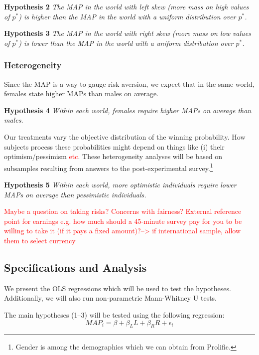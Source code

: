 \noindent \textbf{Hypothesis 2} \quad \textit{The MAP in the world with left skew (more mass on high values of $p^*$) is higher than the MAP in the world with a uniform distribution over $p^*$.}

\noindent \textbf{Hypothesis 3} \quad \textit{The MAP in the world with right skew (more mass on low values of $p^*$) is lower than the MAP in the world with a uniform distribution over $p^*$.}

\subsubsection{Heterogeneity}
Since the MAP is a way to gauge risk aversion, we expect that in the same world, females state higher MAPs than males on average.

\noindent \textbf{Hypothesis 4} \quad \textit{Within each world, females require higher MAPs on average than males.}

Our treatments vary the objective distribution of the winning probability.
How subjects process these probabilities might depend on things like (i) their optimism/pessimism \textcolor{red}{etc}.
These heterogeneity analyses will be based on subsamples resulting from answers to the post-experimental survey.\footnote{
Gender is among the demographics which we can obtain from Prolific.
}

\noindent \textbf{Hypothesis 5} \quad \textit{Within each world, more optimistic individuals require lower MAPs on average than pessimistic individuals.}

\textcolor{red}{Maybe a question on taking risks? Concerns with fairness? External reference point for earnings e.g. how much should a 45-minute survey pay for you to be willing to take it (if it pays a fixed amount)?--> if international sample, allow them to select currency}



\subsection{Specifications and Analysis}
We present the OLS regressions which will be used to test the hypotheses.
Additionally, we will also run non-parametric Mann-Whitney U tests.

The main hypotheses (1--3) will be tested using the following regression:
\begin{equation} \label{eq:1}
MAP_i = \beta + \beta_L L + \beta_R R + \epsilon_i
\end{equation}

